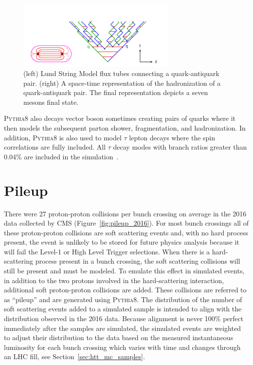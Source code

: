 \begin{figure}[htbp]
\centering
     \includegraphics[width=0.7\textwidth]{simulation/plots/lund_time-space.png}
     \caption{
(left) Lund String Model flux tubes connecting a quark-antiquark pair. (right) A
space-time representation of the hadronization of a quark-antiquark pair. 
The final representation depicts a seven mesons final state.
     }
     \label{fig:sim_lund_string}
\end{figure}

\textsc{Pythia8} also decays vector boson sometimes creating pairs of quarks where
it then models the subsequent parton shower, fragmentation, and hadronization.
In addition, \textsc{Pythia8} is also used to model $\tau$ lepton decays where the spin
correlations are fully included. All $\tau$ decay modes with branch ratios greater than 0.04\%
are included in the simulation~\cite{ILTEN201477}.



\section{Pileup}
\label{sec:sim_pu}
There were 27 proton-proton collisions per bunch crossing on average
in the 2016 data collected by CMS (Figure~\ref{fig:pileup_2016}).
For most bunch crossings all of these proton-proton collisions are soft
scattering events and, with no hard process present, the event is unlikely to be stored for
future physics analysis because it will fail the Level-1 or High Level Trigger selections. 
When there is a hard-scattering process present in a bunch crossing,
the soft scattering collisions will still be present and must be modeled. 
To emulate this effect in simulated events, in addition to the two protons involved in the 
hard-scattering interaction, additional soft proton-proton collisions are added.
These collisions are referred to as ``pileup'' and are generated using
\textsc{Pythia8}. 
The distribution of the number of soft scattering events added to a simulated 
sample is intended to align with the distribution observed in the 2016 data.
Because alignment is never 100\% perfect immediately after the samples are simulated, the simulated events
are weighted to adjust their distribution to the data based on the measured instantaneous
luminosity for each bunch crossing which 
varies with time and changes through an LHC fill, see Section~\ref{sec:htt_mc_samples}.



